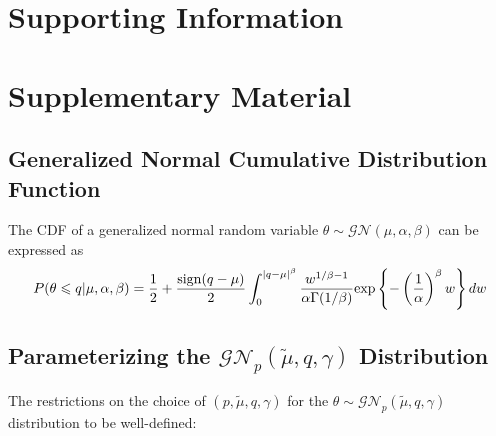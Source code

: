 \documentclass[useAMS,usenatbib,referee]{biom}
\begin{document}
%
%
%



\section*{Supporting Information}

\vspace*{-8pt}

\appendix



\section{Supplementary Material}

\subsection{Generalized Normal Cumulative Distribution Function}
The CDF of a generalized normal random variable $\theta\sim\mathcal{GN}(\mu,\alpha,\beta)$ can be expressed as \citep{Griffin2018}
\begin{equation}
P(\theta\leqslant q|\mu,\alpha,\beta)=\frac{1}{2}+\frac{{\mathrm{sign}}(q-\mu)}{2}\int_0^{|q-\mu|^\beta}\frac{w^{1/\beta-1}}{\alpha\Gamma(1/\beta)}{\mathrm{exp}}\left\{-\left(\frac{1}{\alpha}\right)^\beta w\right\} dw
\end{equation}
\subsection{Parameterizing the $\mathcal{GN}_p(\tilde{\mu},q,\gamma)$ Distribution}
The restrictions on the choice of $(p,\tilde{\mu},q,\gamma)$ for the $\theta\sim\mathcal{GN}_p(\tilde{\mu},q,\gamma)$ distribution to be well-defined:
\end{document}
